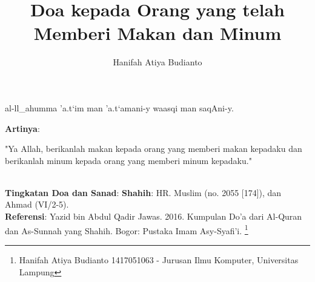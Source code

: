 \documentclass[a4paper,12pt]{article}
\title{\Large Doa kepada Orang yang telah Memberi Makan dan Minum}
\author{\calligra Hanifah Atiya Budianto}
\begin{document}
\sffamily
\maketitle 
\fullvocalize
{}
\begin{arabtext}
\noindent
al-ll_ahumma 'a.t`im man 'a.t`amani-y waasqi man saqAni-y.\\
\end{arabtext}
\noindent
\textbf{Artinya}:
\par
\indent
"Ya Allah, berikanlah makan kepada orang yang memberi makan kepadaku dan 
berikanlah minum kepada orang yang memberi minum kepadaku."\\\\
\par
\noindent
\textbf{Tingkatan Doa dan Sanad}: \textbf{Shahih}: HR. Muslim (no.  2055 
[174]), dan Ahmad (VI/2-5). \\
\textbf{Referensi}: Yazid bin Abdul Qadir Jawas. 2016. Kumpulan Do'a dari
Al-Quran dan As-Sunnah yang Shahih. Bogor: Pustaka Imam Asy-Syafi'i.
\footnote{Hanifah Atiya Budianto 1417051063 - Jurusan Ilmu Komputer,
Universitas Lampung}
\end{document}
